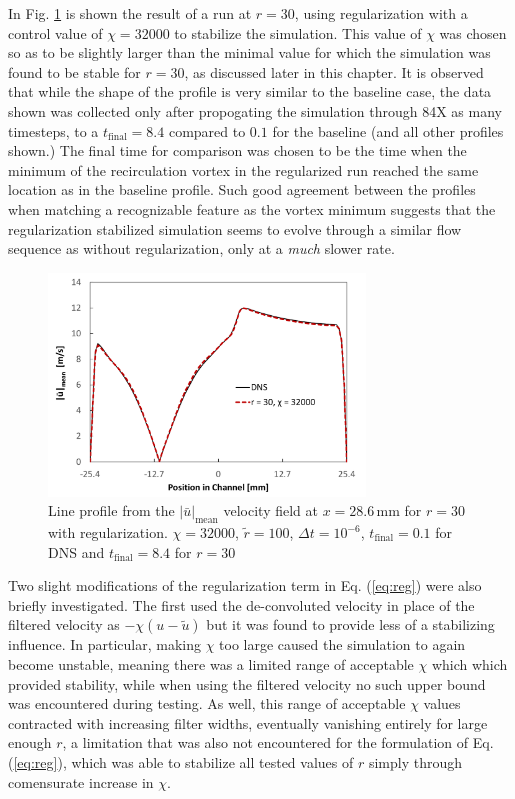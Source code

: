 In Fig. \ref{fig:line_data_reg} is shown the result of a run at $r=30$, using regularization with a control value of $\chi=32000$ to stabilize the simulation. This value of $\chi$ was chosen so as to be slightly larger than the minimal value for which the simulation was found to be stable for $r=30$, as discussed later in this chapter. It is observed that while the shape of the profile is very similar to the baseline case, the data shown was collected only after propogating the simulation through 84X as many timesteps, to a $t_\mathrm{final}=8.4$ compared to $0.1$ for the baseline (and all other profiles shown.) The final time for comparison was chosen to be the time when the minimum of the recirculation vortex in the regularized run reached the same location as in the baseline profile. Such good agreement between the profiles when matching a recognizable feature as the vortex minimum suggests that the regularization stabilized simulation seems to evolve through a similar flow sequence as without regularization, only at a \emph{much} slower rate.

\begin{figure}[!htb]
\centering
\includegraphics[width=0.75\textwidth]{figures/line_data_reg.pdf}
\caption{Line profile from the $|\bar{u}|_{\mathrm{mean}}$ velocity field at $x=28.6\,\mathrm{mm}$ for $r=30$ with regularization. $\chi = 32000$, $\tilde{r}=100$, $\Delta t=10^{-6}$, $t_\mathrm{final}=0.1$ for DNS and $t_\mathrm{final}=8.4$ for $r=30$}
\label{fig:line_data_reg}
\end{figure}

Two slight modifications of the regularization term in Eq. (\ref{eq:reg}) were also briefly investigated. The first used the de-convoluted velocity in place of the filtered velocity as $-\chi(u-\tilde{u})$ but it was found to provide less of a stabilizing influence. In particular, making $\chi$ too large caused the simulation to again become unstable, meaning there was a limited range of acceptable $\chi$ which which provided stability, while when using the filtered velocity no such upper bound was encountered during testing. As well, this range of acceptable $\chi$ values contracted with increasing filter widths, eventually vanishing entirely for large enough $r$, a limitation that was also not encountered for the formulation of Eq. (\ref{eq:reg}), which was able to stabilize all tested values of $r$ simply through comensurate increase in $\chi$.

